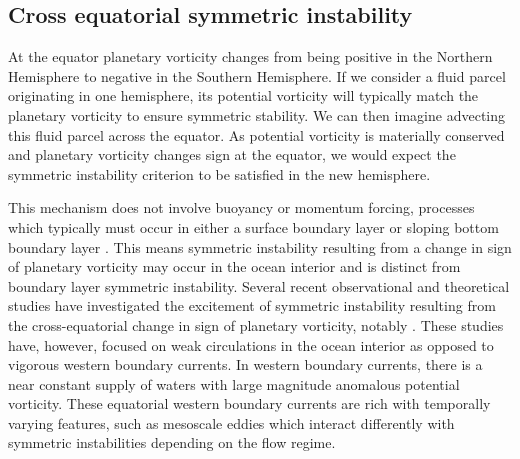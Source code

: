 \subsection{Cross equatorial symmetric instability}
\label{sec:CrossEqSI}
At the equator planetary vorticity changes from being positive in the Northern Hemisphere to negative in the Southern Hemisphere. If we consider a fluid parcel originating in one hemisphere, its potential vorticity will typically match the planetary vorticity to ensure symmetric stability. We can then imagine advecting this fluid parcel across the equator. As potential vorticity is materially conserved and planetary vorticity changes sign at the equator, we would expect the symmetric instability criterion to be satisfied in the new hemisphere.

This mechanism does not involve buoyancy or momentum forcing, processes which typically must occur in either a surface boundary layer or sloping bottom boundary layer \citep{Haine1998, Wenegrat2020}. This means symmetric instability resulting from a change in sign of planetary vorticity may occur in the ocean interior and is distinct from boundary layer symmetric instability. Several recent observational and theoretical studies have investigated the excitement of symmetric instability resulting from the cross-equatorial change in sign of planetary vorticity, notably \citet{Jakoboski2022, Forryan2021, Zhou2022}. These studies have, however, focused on weak circulations in the ocean interior as opposed to vigorous western boundary currents. In western boundary currents, there is a near constant supply of waters with large magnitude anomalous potential vorticity. These equatorial western boundary currents are rich with temporally varying features, such as mesoscale eddies \citep{Edwards1998I, Dengler2004} which interact differently with symmetric instabilities depending on the flow regime.

